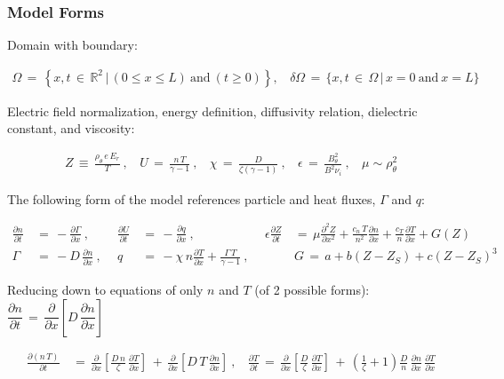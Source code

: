 \documentclass[a4paper,8pt]{article}
\begin{document}
\normalsize

\subsubsection{Model Forms}\label{model-forms}

Domain with boundary: \small

\begin{align}
    \Omega \,=\, \left\{x, t \,\in\, \mathbb{R}^2 \,|\, (0 \leq x \leq L)
        ~\text{and}~ (t \geq 0)\right\}, ~~~~ \delta\Omega \,=\,
        \{x, t \,\in\, \Omega \,|\, x = 0 ~\text{and}~ x = L \}
\end{align}

\normalsize

Electric field normalization, energy definition, diffusivity relation,
dielectric constant, and viscosity: \small

\begin{align}
    Z \,\equiv\, \frac{\rho_\theta \, e \, E_r}{T}~, ~~~~
        U \,=\, \frac{n\,T}{\gamma - 1}~, ~~~~
        \chi \,=\, \frac{D}{\zeta(\gamma - 1)}~, ~~~~
        \epsilon \,=\, \frac{B_\theta^2}{B^2 \nu_i}~, ~~~~\mu \sim \rho_\theta^2
\end{align}

\normalsize

The following form of the model references particle and heat fluxes,
\(\Gamma\) and \(q\): \small

\begin{align}
    \frac{\partial n}{\partial t} \,&=\, -\frac{\partial \Gamma}{\partial x}~,~~&
    \frac{\partial U}{\partial t} \,&=\, -\frac{\partial q}{\partial x}~,~~&
    \epsilon \frac{\partial Z}{\partial t} \,&=\,
        \mu \frac{\partial^2 Z}{\partial x^2} + \frac{c_n \, T}{n^2}
        \frac{\partial n}{\partial x} +
        \frac{c_T}{n} \frac{\partial T}{\partial x} + G(Z) \\
    \Gamma \,&=\, -D \, \frac{\partial n}{\partial x}~,~~&
    q \,&=\, -\chi \, n \frac{\partial T}{\partial x} +
        \frac{\Gamma\,T}{\gamma - 1}~,~~&
    &G \,=\, a + b(Z - Z_S) + c(Z - Z_S)^3
\end{align}

\normalsize

Reducing down to equations of only \(n\) and \(T\) (of 2 possible
forms):
\(\dfrac{\partial n}{\partial t} \,=\, \dfrac{\partial}{\partial x}\left[D \, \dfrac{\partial n}{\partial x}\right]\)
\small

\begin{align}
    \frac{\partial(n\,T)}{\partial t} \,&=\,
        \frac{\partial}{\partial x}\left[\frac{D\,n}{\zeta} \,
        \frac{\partial T}{\partial x}\right] \,+\,
        \frac{\partial}{\partial x}\left[D\,T \,
        \frac{\partial n}{\partial x}\right]~, ~~~~
        \frac{\partial T}{\partial t} \,=\, \frac{\partial }{\partial x}
        \left[\frac{D}{\zeta} \, \frac{\partial T}{\partial x}\right] \,+\,
        \left(\frac{1}{\zeta} + 1\right) \frac{D}{n} \,
        \frac{\partial n}{\partial x} \, \frac{\partial T}{\partial x}
\end{align}
\end{document}
